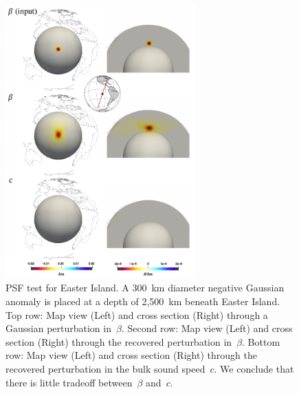 \documentclass[extra,mreferee]{gji}
\begin{document}
\begin{figure}
  \centering
  \includegraphics[width=0.65\textwidth]{figures/psf/easter.pdf}
  \caption{\small{PSF test for Easter Island.
  A 300~km diameter negative Gaussian anomaly is placed at a depth of 2,500~km beneath Easter Island.
  Top row: Map view (Left) and cross section (Right) through a Gaussian perturbation in~$\beta$.
  Second row: Map view (Left) and cross section (Right) through the recovered perturbation in~$\beta$.
  Bottom row: Map view (Left) and cross section (Right) through the recovered perturbation in the bulk sound speed~$c$. We conclude that there is little tradeoff between~$\beta$ and~$c$.
  }}
  \label{fig:psf_easter}
\end{figure}
\end{document}
